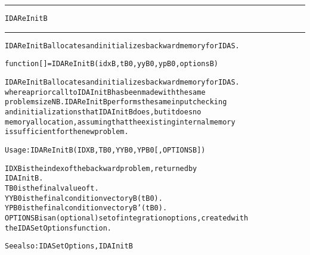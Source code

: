 \begin{samepage}
\hrule
\begin{center}
{\large \verb!IDAReInitB!}
\label{p:IDAReInitB}
\end{center}
\hrule\vspace{0.1in}



\begin{alltt}
IDAReInitB allocates and initializes backward memory for IDAS.
\end{alltt}

\end{samepage}



\begin{samepage}


\begin{alltt}
function [] = IDAReInitB(idxB,tB0,yyB0,ypB0,optionsB) 
\end{alltt}

\end{samepage}



\begin{alltt}
IDAReInitB allocates and initializes backward memory for IDAS.
   where a prior call to IDAInitB has been made with the same
   problem size NB. IDAReInitB performs the same input checking
   and initializations that IDAInitB does, but it does no 
   memory allocation, assuming that the existing internal memory 
   is sufficient for the new problem.

   Usage:   IDAReInitB ( IDXB, TB0, YYB0, YPB0 [, OPTIONSB] )

   IDXB     is the index of the backward problem, returned by
            IDAInitB.
   TB0      is the final value of t.
   YYB0     is the final condition vector yB(tB0).  
   YPB0     is the final condition vector yB'(tB0).
   OPTIONSB is an (optional) set of integration options, created with
            the IDASetOptions function. 

   See also: IDASetOptions, IDAInitB
\end{alltt}






\vspace{0.1in}